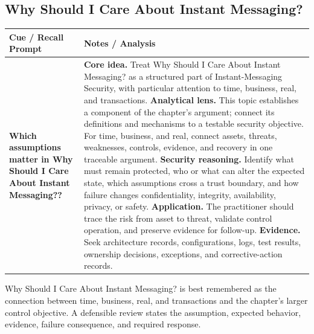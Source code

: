 \documentclass[11pt]{article}
\newcommand{\CornellHeader}{%
\rowcolor{Navy}\color{white}\bfseries Cue / Recall Prompt & \color{white}\bfseries Notes / Analysis\\\hline}
\newcommand{\CornellRow}[2]{%
\cellcolor{CueGray}\RaggedRight\textbf{#1} & \RaggedRight #2\\\hline}
\begin{document}
\subsection*{Why Should I Care About Instant Messaging?}
\begin{longtable}{>{\RaggedRight\arraybackslash}p{}|>{\RaggedRight\arraybackslash}p{}}
\CornellHeader
\CornellRow{Which assumptions matter in Why Should I Care About Instant Messaging??}{\textbf{Core idea.} Treat Why Should I Care About Instant Messaging? as a structured part of Instant-Messaging Security, with particular attention to time, business, real, and transactions. \textbf{Analytical lens.} This topic establishes a component of the chapter's argument; connect its definitions and mechanisms to a testable security objective. For time, business, and real, connect assets, threats, weaknesses, controls, evidence, and recovery in one traceable argument. \textbf{Security reasoning.} Identify what must remain protected, who or what can alter the expected state, which assumptions cross a trust boundary, and how failure changes confidentiality, integrity, availability, privacy, or safety. \textbf{Application.} The practitioner should trace the risk from asset to threat, validate control operation, and preserve evidence for follow-up. \textbf{Evidence.} Seek architecture records, configurations, logs, test results, ownership decisions, exceptions, and corrective-action records.}
\end{longtable}
\begin{topicsummary}
Why Should I Care About Instant Messaging? is best remembered as the connection between time, business, real, and transactions and the chapter's larger control objective. A defensible review states the assumption, expected behavior, evidence, failure consequence, and required response.
\end{topicsummary}
\end{document}
